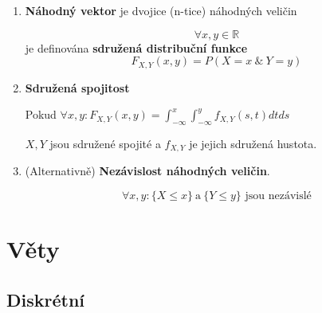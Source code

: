 \documentclass[10pt,a4paper]{article}
\theoremstyle{plain}
\theoremstyle{definition}
\begin{document}
\begin{enumerate}
\item \textbf{Náhodný vektor} je dvojice (n-tice) náhodných veličin

\[\forall x,y \in \mathbb{R}\] je definována \textbf{sdružená distribuční funkce}
\[F_{X,Y}(x,y) = P(X = x\ \&\ Y = y)\]

\item \textbf{Sdružená spojitost}

Pokud $\forall x,y: F_{X,Y}(x,y) = \int^x_{-\infty}\int^y_{-\infty} f_{X,Y}(s,t) dt ds$

$X,Y$ jsou sdružené spojité a $f_{X,Y}$ je jejich sdružená hustota.

\item (Alternativně) \textbf{Nezávislost náhodných veličin}.

\[ \forall x,y: \{ X\leq x \} \ \text{a} \ \{Y \leq y\} \text{ jsou nezávislé}\]

\end{enumerate}

\section{Věty}

\subsection*{Diskrétní}
\end{document}
